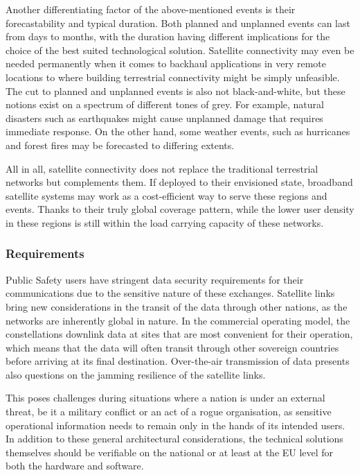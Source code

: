 \documentclass[english, 12pt, a4paper, elec, utf8, a-1b, online]{aaltothesis}
\begin{document}
Another differentiating factor of the above-mentioned events is their forecastability and typical duration.
Both planned and unplanned events can last from days to months, with the duration having different implications for the choice of the best suited technological solution.
Satellite connectivity may even be needed permanently when it comes to backhaul applications in very remote locations to where building terrestrial connectivity might be simply unfeasible.
The cut to planned and unplanned events is also not black-and-white, but these notions exist on a spectrum of different tones of grey.
For example, natural disasters such as earthquakes might cause unplanned damage that requires immediate response.
On the other hand, some weather events, such as hurricanes and forest fires may be forecasted to differing extents.

All in all, satellite connectivity does not replace the traditional terrestrial networks but complements them. If deployed to their envisioned state, broadband satellite systems may work as a cost-efficient way to serve these regions and events. Thanks to their truly global coverage pattern, while the lower user density in these regions is still within the load carrying capacity of these networks.

\subsubsection{Requirements}

Public Safety users have stringent data security requirements for their communications due to the sensitive nature of these exchanges.
Satellite links bring new considerations in the transit of the data through other nations, as the networks are inherently global in nature.
In the commercial operating model, the constellations downlink data at sites that are most convenient for their operation, which means that the data will often transit through other sovereign countries before arriving at its final destination.
Over-the-air transmission of data presents also questions on the jamming resilience of the satellite links.

This poses challenges during situations where a nation is under an external threat, be it a military conflict or an act of a rogue organisation, as sensitive operational information needs to remain only in the hands of its intended users. In addition to these general architectural considerations, the technical solutions themselves should be verifiable on the national or at least at the EU level for both the hardware and software.
\end{document}
